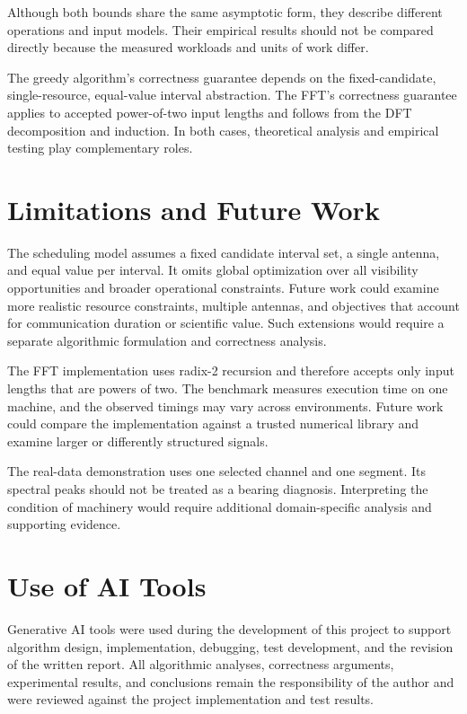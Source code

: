 \documentclass[conference]{IEEEtran}
\begin{document}
Although both bounds share the same asymptotic form, they describe
different operations and input models. Their empirical results should
not be compared directly because the measured workloads and units of
work differ.

The greedy algorithm's correctness guarantee depends on the
fixed-candidate, single-resource, equal-value interval abstraction.
The FFT's correctness guarantee applies to accepted power-of-two
input lengths and follows from the DFT decomposition and induction.
In both cases, theoretical analysis and empirical testing play
complementary roles.

\section{Limitations and Future Work}

The scheduling model assumes a fixed candidate interval set, a
single antenna, and equal value per interval. It omits global
optimization over all visibility opportunities and broader operational
constraints. Future work could examine more realistic resource
constraints, multiple antennas, and objectives that account for
communication duration or scientific value. Such extensions would
require a separate algorithmic formulation and correctness analysis.

The FFT implementation uses radix-2 recursion and therefore accepts
only input lengths that are powers of two. The benchmark measures
execution time on one machine, and the observed timings may vary
across environments. Future work could compare the implementation
against a trusted numerical library and examine larger or differently
structured signals.

The real-data demonstration uses one selected channel and one segment.
Its spectral peaks should not be treated as a bearing diagnosis.
Interpreting the condition of machinery would require additional
domain-specific analysis and supporting evidence.

\section{Use of AI Tools}

Generative AI tools were used during the development of this project to support algorithm design, implementation, debugging, test development, and the revision of the written report. All algorithmic analyses, correctness arguments, experimental results, and conclusions remain the responsibility of the author and were reviewed against the project implementation and test results.
\end{document}
